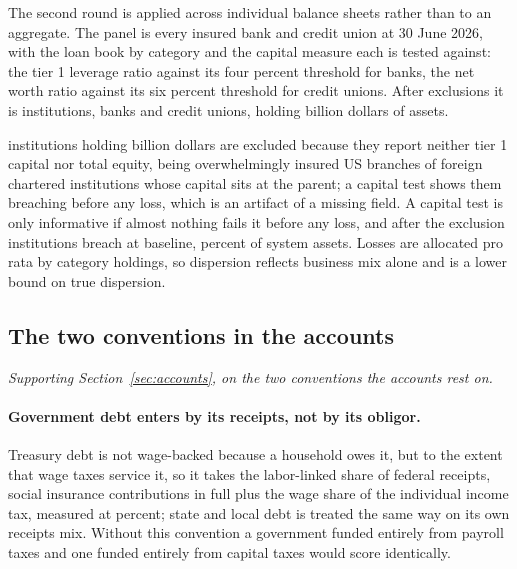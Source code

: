 The second round is applied across individual balance sheets rather than to an aggregate. The
panel is every insured bank and credit union at 30 June 2026, with the loan book by category and
the capital measure each is tested against: the tier 1 leverage ratio against its four percent
threshold for banks, the net worth ratio against its six percent threshold for credit unions.
After exclusions it is  institutions,  banks and
 credit unions, holding  billion dollars of assets.

 institutions holding  billion dollars are
excluded because they report neither tier 1 capital nor total equity, being overwhelmingly insured
US branches of foreign chartered institutions whose capital sits at the parent; a capital test
shows them breaching before any loss, which is an artifact of a missing field. A capital test is
only informative if almost nothing fails it before any loss, and after the exclusion
 institutions breach at baseline,  percent of
system assets. Losses are allocated pro rata by category holdings, so dispersion reflects business
mix alone and is a lower bound on true dispersion.

\subsection{The two conventions in the accounts}

\emph{Supporting Section~\ref{sec:accounts}, on the two conventions the accounts rest on.}

\paragraph{Government debt enters by its receipts, not by its obligor.} Treasury debt is not
wage-backed because a household owes it, but to the extent that wage taxes service it, so it takes
the labor-linked share of federal receipts, social insurance contributions in full plus the wage
share of the individual income tax, measured at  percent; state and local
debt is treated the same way on its own receipts mix. Without this convention a government funded
entirely from payroll taxes and one funded entirely from capital taxes would score identically.

